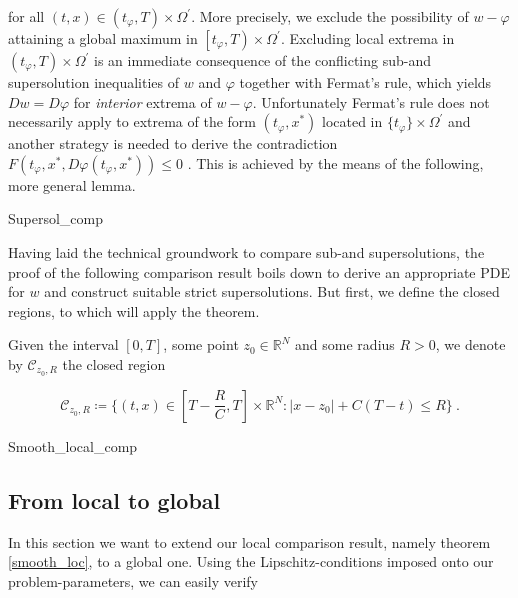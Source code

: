 		for all $ (t, x) \in \left( t_{\varphi}, T \right) \times\Omega^{\prime} $. More precisely, we exclude the possibility of $ w -\varphi $ attaining a global maximum in $ \left[ t_{\varphi}, T \right) \times \Omega^{\prime} $. Excluding local extrema in ${ \left( t_{\varphi}, T \right) \times \Omega^{\prime} }$ is an immediate consequence of the conflicting sub-and supersolution inequalities of $ w $ and $ \varphi $ together with Fermat's rule, which yields $ Dw = D\varphi $ for \emph{interior} extrema of $ w - \varphi $. Unfortunately Fermat's rule does not necessarily apply to extrema of the form $ (t_{\varphi}, x^{*}) $ located in $ \{t_{\varphi} \}\times \Omega^{\prime}  $ and another strategy is needed to derive the contradiction $ F(t_{\varphi}, x^{*}, D\varphi(t_\varphi, x^{*})) \leq 0 $ . This is achieved by the means of the following, more general lemma.
		
		{Supersol_comp}
	
		Having laid the technical groundwork to compare sub-and supersolutions, the proof of the following comparison result boils down to derive an appropriate PDE for $ w $ and construct suitable strict supersolutions. But first, we define the closed regions, to which will apply the theorem.
		
		\begin{definition}
			\label{regions}
			Given the interval $ \left[0, T\right] $, some point $ z_0 \in \mathbb{R}^N $ and some radius $ R > 0 $, we denote by $ \mathcal{C}_{z_0, R} $ the closed region
			
			\begin{equation*}
			\mathcal{C}_{z_0, R} \coloneqq \Bigg\{ (t, x) \in \left[ T - \frac{R}{C}, T \right] \times \mathbb{R}^N: \lvert x - z_0 \rvert + C(T-t) \leq R \Bigg\} \ .
			\end{equation*}
		\end{definition}
		
		{Smooth_local_comp}
	
	\subsection{From local to global}
		In this section we want to extend our local comparison result, namely theorem \ref{smooth_loc}, to a global one. Using the Lipschitz-conditions imposed onto our problem-parameters, we can easily verify
		

